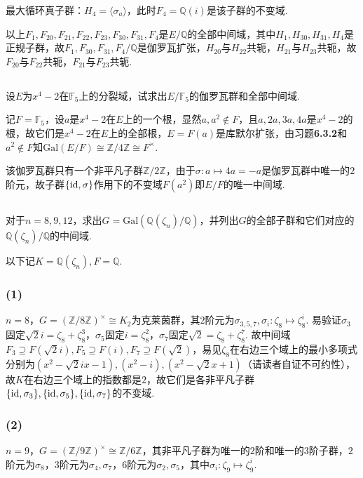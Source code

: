 最大循环真子群：$H_{4}=\langle \sigma_a \rangle$，此时$F_4=\mathbb{Q}(i)$是该子群的不变域.

以上$F_1,F_{20},F_{21},F_{22},F_{23},F_{30},F_{31},F_4$是$E/\mathbb{Q}$的全部中间域，其中$H_1,H_{30},H_{31},H_4$是正规子群，故$F_1,F_{30},F_{31},F_4/\mathbb{Q}$是伽罗瓦扩张，$H_{20}$与$H_{22}$共轭，$H_{21}$与$H_{23}$共轭，故$F_{20}$与$F_{22}$共轭，$F_{21}$与$F_{23}$共轭.

\subsection{}
设$E$为$x^4-2$在$\mathbb{F}_5$上的分裂域，试求出$E/\mathbb{F}_5$的伽罗瓦群和全部中间域.

\jie 记$F=\mathbb{F}_5$，设$a$是$x^4-2$在$E$上的一个根，显然$a, a^2\notin F$，且$a, 2a, 3a, 4a$是$x^4-2$的根，故它们是$x^4-2$在$E$上的全部根，$E=F(a)$是库默尔扩张，由{\heiti 习题}\textbf{6.3.2}和$a^2\notin F$知$\mathrm{Gal}(E/F)\cong\mathbb{Z}/4\mathbb{Z}\cong F^{\times}$.

该伽罗瓦群只有一个非平凡子群$\mathbb{Z}/2\mathbb{Z}$，由于$\sigma: a\mapsto 4a=-a$是伽罗瓦群中唯一的$2$阶元，故子群$\{\operatorname{id}, \sigma\}$作用下的不变域$F(a^2)$即$E/F$的唯一中间域.

\subsection{}
对于$n=8,9,12$，求出$G=\mathrm{Gal}(\mathbb{Q}(\zeta_n)/\mathbb{Q})$，并列出$G$的全部子群和它们对应的$\mathbb{Q}(\zeta_n)/\mathbb{Q}$的中间域.

\jie 以下记$K=\mathbb{Q}(\zeta_n), F=\mathbb{Q}$.
\subsubsection{(1)}
$n=8$，$G=(\mathbb{Z}/8\mathbb{Z})^{\times}\cong K_2$为克莱茵群，其$2$阶元为$\sigma_{3,5,7}, \sigma_i:\zeta_8\mapsto\zeta_8^i$. 易验证$\sigma_3$固定$\sqrt{2}i=\zeta_8+\zeta_8^3$，$\sigma_5$固定$i=\zeta_8^2$，$\sigma_7$固定$\sqrt{2}=\zeta_8+\zeta_8^7$. 故中间域$F_3\supseteq F(\sqrt{2}i), F_5\supseteq F(i), F_7\supseteq F(\sqrt{2})$，易见$\zeta_8$在右边三个域上的最小多项式分别为$(x^2-\sqrt{2}ix-1),(x^2-i),(x^2-\sqrt{2}x+1)$（请读者自证不可约性），故$K$在右边三个域上的指数都是$2$，故它们是各非平凡子群$\{\operatorname{id}, \sigma_3\},\{\operatorname{id}, \sigma_5\},\{\operatorname{id}, \sigma_7\}$的不变域.
\subsubsection{(2)}
$n=9$，$G=(\mathbb{Z}/9\mathbb{Z})^{\times}\cong\mathbb{Z}/6\mathbb{Z}$，其非平凡子群为唯一的$2$阶和唯一的$3$阶子群，$2$阶元为$\sigma_8$，$3$阶元为$\sigma_4,\sigma_7$，$6$阶元为$\sigma_2,\sigma_5$，其中$\sigma_i: \zeta_9\mapsto \zeta_9^i$.

